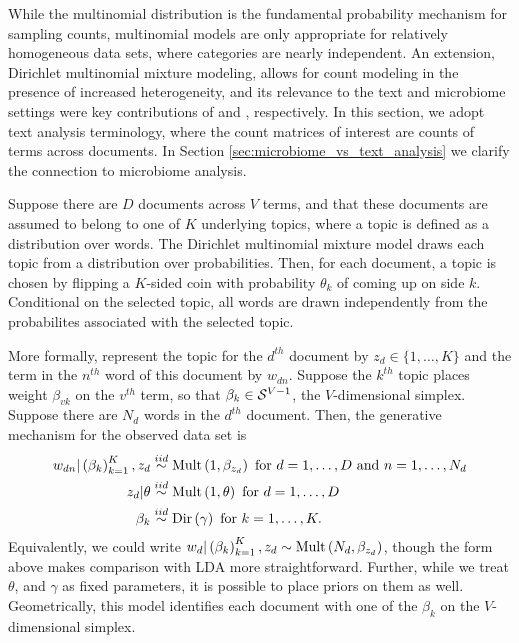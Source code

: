 While the multinomial distribution is the fundamental probability mechanism for
sampling counts, multinomial models are only appropriate for relatively
homogeneous data sets, where categories are nearly independent. An extension,
Dirichlet multinomial mixture modeling, allows for count modeling in the
presence of increased heterogeneity, and its relevance to the text and
microbiome settings were key contributions of \cite{nigam2000text} and
\cite{holmes2012dirichlet}, respectively. In this section, we adopt text
analysis terminology, where the count matrices of interest are counts of terms
across documents. In Section \ref{sec:microbiome_vs_text_analysis} we clarify
the connection to microbiome analysis.

Suppose there are $D$ documents across $V$ terms, and that these documents are
assumed to belong to one of $K$ underlying topics, where a topic is defined as a
distribution over words. The Dirichlet multinomial mixture model draws each
topic from a distribution over probabilities. Then, for each document, a topic
is chosen by flipping a $K$-sided coin with probability $\theta_{k}$ of coming
up on side $k$. Conditional on the selected topic, all words are drawn
independently from the probabilites associated with the selected topic.

More formally, represent the topic for the $d^{th}$ document by $z_{d} \in \{1,
\dots, K\}$ and the term in the $n^{th}$ word of this document by $w_{dn}$.
Suppose the $k^{th}$ topic places weight $\beta_{vk}$ on the $v^{th}$ term, so
that $\beta_{k} \in \mathcal{S}^{V - 1}$, the $V$-dimensional simplex. Suppose
there are $N_{d}$ words in the $d^{th}$ document. Then, the generative mechanism
for the observed data set is
\begin{align*}
  w_{dn} \vert \left(\beta_{k}\right)_{k = 1}^{K}, z_{d} &\overset{iid}{\sim}\textnormal{Mult}\left(1, \beta_{z_{d}}\right) \text{ for } d = 1, \dots, D \text{ and } n = 1, \dots, N_{d} \\
  z_{d} \vert \theta &\overset{iid}{\sim} \textnormal{Mult}\left(1, \theta\right) \text{ for } d = 1, \dots, D \\
  \beta_{k} &\overset{iid}{\sim} \textnormal{Dir}\left(\gamma\right) \text{ for } k = 1, \dots, K.
\end{align*}
Equivalently, we could write $w_{d} \vert \left(\beta_{k}\right)_{k = 1}^{K},
z_{d} \sim \textnormal{Mult}\left(N_{d}, \beta_{z_{d}}\right)$, though the form above makes
comparison with LDA more straightforward. Further, while we treat $\theta$, and
$\gamma$ as fixed parameters, it is possible to place priors on them as well.
Geometrically, this model identifies each document with one of the $\beta_{k}$ on
the $V$-dimensional simplex.

